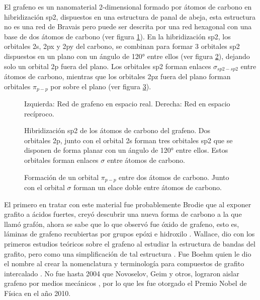 
El grafeno es un nanomaterial 2-dimensional formado por átomos de carbono en hibridización sp2, dispuestos en una estructura de panal de abeja, esta estructura no es una red de Bravais pero puede ser descrita por una red hexagonal con una base de dos átomos de carbono (ver figura \ref{fig_graphene_lattice}). En la hibridización sp2, los orbitales 2s, 2px y 2py del carbono, se combinan para formar 3 orbitales sp2 dispuestos en un plano con un ángulo de 120° entre ellos (ver figura \ref{fig:sp2_hybrid}), dejando solo un orbital 2p fuera del plano. Los orbitales sp2 forman enlaces $\sigma_{sp2-sp2}$ entre átomos de carbono, mientras que los orbitales 2pz fuera del plano forman orbitales $\pi_{p-p}$ por sobre el plano (ver figura \ref{fig:pi_orbitals}).

\begin{figure}
	\centering
	\caption{Izquierda: Red de grafeno en espacio real. Derecha: Red en espacio recíproco.}
	\label{fig_graphene_lattice}
\end{figure}

\begin{figure}
	\centering
	\caption{Hibridización sp2 de los átomos de carbono del grafeno. Dos orbitales 2p, junto con el orbital 2s forman tres orbitales sp2 que se disponen de forma planar con un ángulo de 120° entre ellos. Estos orbitales forman enlaces $\sigma$ entre átomos de carbono.}
	\label{fig:sp2_hybrid}
\end{figure}

\begin{figure}
	\centering
	\caption{Formación de un orbital $\pi_{p-p}$ entre dos átomos de carbono. Junto con el orbital $\sigma$ forman un elace doble entre átomos de carbono.}
	\label{fig:pi_orbitals}
\end{figure}

El primero en tratar con este material fue probablemente Brodie \citep{Brodie1859} que al exponer grafito a ácidos fuertes, creyó descubrir una nueva forma de carbono a la que llamó grafón, ahora se sabe que lo que observó fue óxido de grafeno, esto es, láminas de grafeno recubiertas por grupos epóxi e hidroxilo \citep{Geim2012}. Wallace, dio con los primeros estudios teóricos sobre el grafeno al estudiar la estructura de bandas del grafito, pero como una simplificación de tal estructura \citep{Wallace1947}. Fue Boehm quien le dio el nombre al crear la nomenclatura y terminología para compuestos de grafito intercalado \citep{Boehm1986}. No fue hasta 2004 que Novoselov, Geim y otros, lograron aislar grafeno por medios mecánicos \citep{Novoselov2004}, por lo que les fue otorgado el Premio Nobel de Física en el año 2010.


